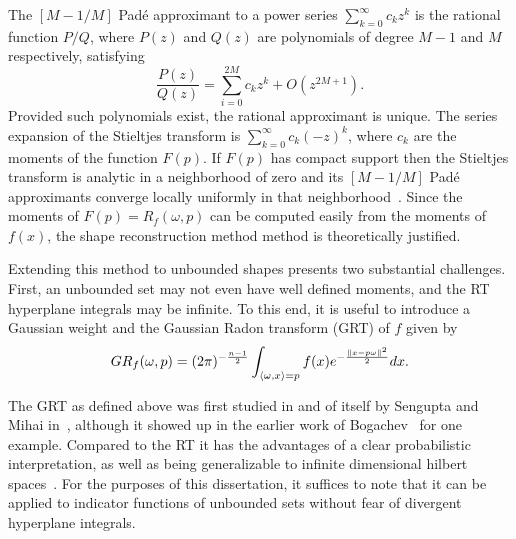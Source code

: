 The $[M-1/M]$ Pad\'e approximant to a power series $\sum_{k = 0}^\infty c_k z^k$ is the rational function $P/Q$, where $P(z)$ and $Q(z)$ are polynomials of degree $M-1$ and $M$ respectively, satisfying
\[
  \frac{P(z)}{Q(z)} = \sum_{i = 0}^{2M} c_k z^k + O(z^{2M + 1}).
\]
Provided such polynomials exist, the rational approximant is unique. The series expansion of the Stieltjes transform is $\sum_{k = 0}^\infty c_k(-z)^k$, where $c_k$ are the moments of the function $F(p)$. If $F(p)$ has compact support then the Stieltjes transform is analytic in a neighborhood of zero and its $[M-1/M]$ Pad\'e approximants converge locally uniformly in that neighborhood~\cite{Bake81}. Since the moments of $F(p) = R_f(\omega, p)$ can be computed easily from the moments of $f(x)$, the shape reconstruction method method is theoretically justified.

Extending this method to unbounded shapes presents two substantial challenges. First, an unbounded set may not even have well defined moments, and the RT hyperplane integrals may be infinite. To this end, it is useful to introduce a Gaussian weight and the Gaussian Radon transform (GRT) of $f$ given by
\begin{equation} \label{eq:GRT}
  GR_f(\omega, p) = (2\pi)^{-\frac{n-1}{2}} \int_{\langle \omega, x \rangle = p} f(x) e^{-\frac{\left\| x - p\omega \right\|^2}{2}} dx.
\end{equation}

The GRT as defined above was first studied in and of itself by Sengupta and Mihai in~\cite{Miha04}, although it showed up in the earlier work of Bogachev~\cite{bogachev_gaussian_1998} for one example. Compared to the RT it has the advantages of a clear probabilistic interpretation, as well as being generalizable to infinite dimensional hilbert spaces~\cite{Miha04}. For the purposes of this dissertation, it suffices to note that it can be applied to indicator functions of unbounded sets without fear of divergent hyperplane integrals.

